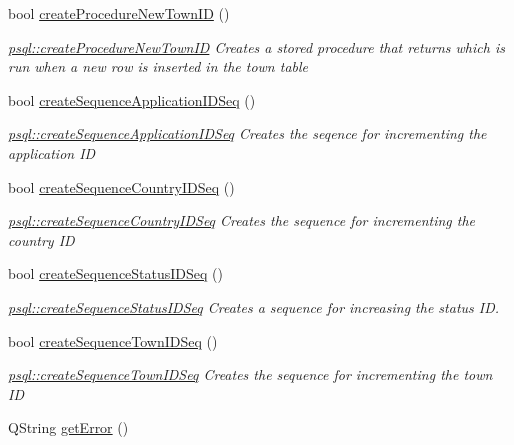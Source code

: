 \begin{DoxyCompactItemize}
bool \mbox{\hyperlink{classpsql_ade0c7fa4f019c3f349230af09b1de49e}{create\+Procedure\+New\+Town\+ID}} ()
\begin{DoxyCompactList}\small\item\em \mbox{\hyperlink{classpsql_ade0c7fa4f019c3f349230af09b1de49e}{psql\+::create\+Procedure\+New\+Town\+ID}} Creates a stored procedure that returns which is run when a new row is inserted in the town table \end{DoxyCompactList}\item 
bool \mbox{\hyperlink{classpsql_a54c75d0896ee6aad58e22c830895c106}{create\+Sequence\+Application\+I\+D\+Seq}} ()
\begin{DoxyCompactList}\small\item\em \mbox{\hyperlink{classpsql_a54c75d0896ee6aad58e22c830895c106}{psql\+::create\+Sequence\+Application\+I\+D\+Seq}} Creates the seqence for incrementing the application ID \end{DoxyCompactList}\item 
bool \mbox{\hyperlink{classpsql_aa907c84f592212451d3d59a2061adabd}{create\+Sequence\+Country\+I\+D\+Seq}} ()
\begin{DoxyCompactList}\small\item\em \mbox{\hyperlink{classpsql_aa907c84f592212451d3d59a2061adabd}{psql\+::create\+Sequence\+Country\+I\+D\+Seq}} Creates the sequence for incrementing the country ID \end{DoxyCompactList}\item 
bool \mbox{\hyperlink{classpsql_ae882aa80b2d629383fc2e60aecfd421a}{create\+Sequence\+Status\+I\+D\+Seq}} ()
\begin{DoxyCompactList}\small\item\em \mbox{\hyperlink{classpsql_ae882aa80b2d629383fc2e60aecfd421a}{psql\+::create\+Sequence\+Status\+I\+D\+Seq}} Creates a sequence for increasing the status ID. \end{DoxyCompactList}\item 
bool \mbox{\hyperlink{classpsql_a6ce21cb5a1e77cb0c280e2932d2b557d}{create\+Sequence\+Town\+I\+D\+Seq}} ()
\begin{DoxyCompactList}\small\item\em \mbox{\hyperlink{classpsql_a6ce21cb5a1e77cb0c280e2932d2b557d}{psql\+::create\+Sequence\+Town\+I\+D\+Seq}} Creates the sequence for incrementing the town ID \end{DoxyCompactList}\item 
Q\+String \mbox{\hyperlink{classpsql_a5f51e254b67ff932f287df2184ccc043}{get\+Error}} ()

\end{DoxyCompactItemize}
